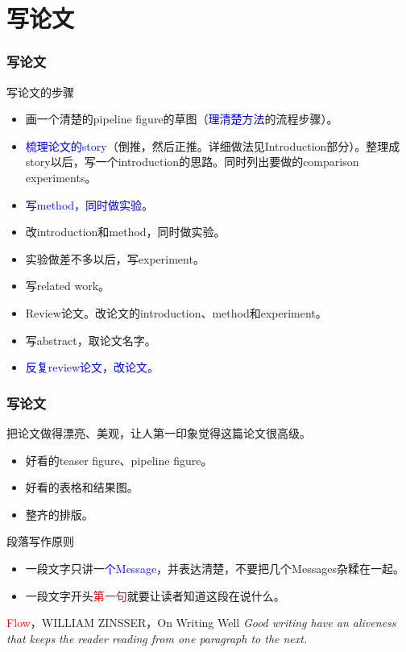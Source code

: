 \documentclass{beamer}
\begin{document}
\section{写论文}
\begin{frame}
    \frametitle{写论文}
    \begin{block}{写论文的步骤}
        \begin{itemize}
            \item 画一个清楚的pipeline figure的草图（\textcolor{blue}{理清楚方法}的流程步骤）。
            \item \textcolor{blue}{梳理论文的story}（倒推，然后正推。详细做法见Introduction部分）。整理成story以后，写一个introduction的思路。同时列出要做的comparison experiments。
            \item \textcolor{blue}{写method，同时做实验。}
            \item 改introduction和method，同时做实验。
            \item 实验做差不多以后，写experiment。
            \item 写related work。
            \item Review论文。改论文的introduction、method和experiment。
            \item 写abstract，取论文名字。
            \item \textcolor{blue}{反复review论文，改论文。}
        \end{itemize}
    \end{block}
\end{frame}

\begin{frame}
    \frametitle{写论文}
    \begin{block}{把论文做得漂亮、美观，让人第一印象觉得这篇论文很高级。}
        \begin{itemize}
            \item 好看的teaser figure、pipeline figure。
            \item 好看的表格和结果图。
            \item 整齐的排版。
        \end{itemize}
    \end{block}
    \begin{block}{段落写作原则}
        \begin{itemize}
            \item 一段文字只讲\textcolor{blue}{一个Message}，并表达清楚，不要把几个Messages杂糅在一起。
            \item 一段文字开头\textcolor{red}{第一句}就要让读者知道这段在说什么。
        \end{itemize}
    \end{block}
    \begin{block}{\textcolor{red}{Flow}，WILLIAM ZINSSER，On Writing Well}
        \textit{Good writing have an aliveness that keeps the reader reading from one paragraph to the next.}
    \end{block}
\end{frame}
\end{document}
